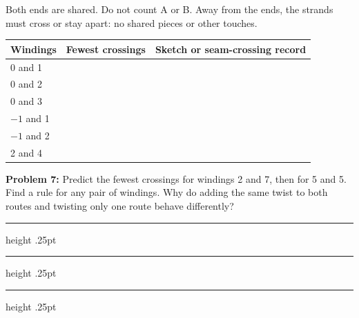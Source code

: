 \documentclass[11pt,letterpaper]{article}
\newcommand{\problem}[2]{\textbf{Problem #1:} #2\par}
\newcommand{\answerline}{\par\vspace{.32in}\hrule height .25pt}
\begin{document}
Both ends are shared. Do not count A or B. Away from the ends, the strands must cross or stay apart: no shared pieces or other touches.
\vspace{.12in}
\par\begin{tabular}{@{}p{.24\linewidth}p{.22\linewidth}p{.44\linewidth}@{}}
Windings & Fewest crossings & Sketch or seam-crossing record\\\hline
0 and 1 & & \\[.33in]\hline
0 and 2 & & \\[.33in]\hline
0 and 3 & & \\[.33in]\hline
$-1$ and 1 & & \\[.33in]\hline
$-1$ and 2 & & \\[.33in]\hline
2 and 4 & & \\[.33in]\hline
\end{tabular}\par
\vspace{.17in}
\problem{7}{Predict the fewest crossings for windings 2 and 7, then for 5 and 5. Find a rule for any pair of windings. Why do adding the same twist to both routes and twisting only one route behave differently?}
\answerline\answerline\answerline
\end{document}
